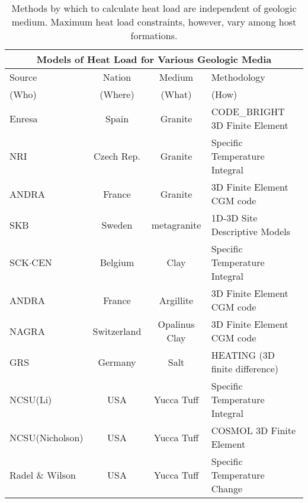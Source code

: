  \begin{table}[h!]
    \centering
    \footnotesize{
    \begin{tabularx}{\textwidth}{|X|c|c|X|}
      \multicolumn{4}{c}{\textbf{Models of Heat Load for Various Geologic Media}}\\
      \hline
      Source & Nation & Medium & Methodology \\  
      (Who) & (Where) & (What) & (How) \\  
      \hline
      Enresa \cite{von_lensa_red-impact_2008}           & Spain       & Granite       &  CODE\_BRIGHT 3D Finite Element \\ 
      NRI   \cite{von_lensa_red-impact_2008}            & Czech Rep.  & Granite       &  Specific Temperature Integral   \\
      ANDRA \cite{andra_granite:_2005}                  & France      & Granite       &  3D Finite Element CGM code   \\
      SKB \cite{ab_long-term_2006}                      & Sweden      & metagranite   &  1D-3D Site  Descriptive Models \\
      SCK$\cdot$CEN   \cite{von_lensa_red-impact_2008}  & Belgium     & Clay          &  Specific Temperature Integral   \\ 
      ANDRA \cite{andra_argile:_2005}                   & France      & Argillite &  3D Finite Element CGM code   \\
      NAGRA \cite{johnson_project_2002, johnson_calculations_2002}  & Switzerland  & Opalinus Clay &  3D Finite Element CGM code \\
      GRS \cite{von_lensa_red-impact_2008}              & Germany     & Salt          &  HEATING (3D finite difference)   \\ 
      NCSU(Li)   \cite{li_examining_2007}               & USA         & Yucca Tuff    &  Specific Temperature Integral \\        
      NCSU(Nicholson) \cite{nicholson_thermal_2007}     & USA         & Yucca Tuff    &  COSMOL 3D Finite Element\\
      Radel \& Wilson \cite{radel_repository_2007}      & USA         & Yucca Tuff    &  Specific Temperature Change \\ 
      \hline
    \end{tabularx}
    \caption[International heat transport modeling methods in various geologic host media.]{Methods by which to calculate heat 
    load are independent of geologic medium. Maximum heat load constraints, however, vary among host formations. }
    \label{tab:heat}
    }
  \end{table}

